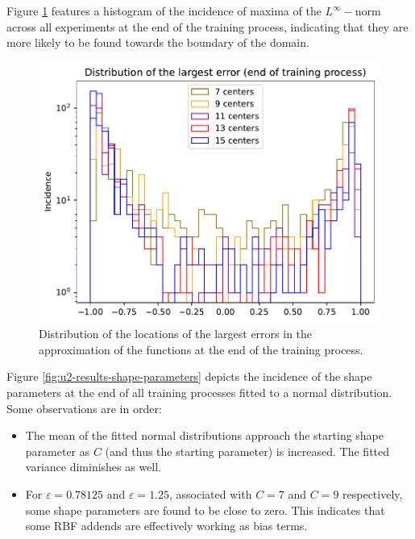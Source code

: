 \documentclass[12pt]{report} %
\begin{document}
Figure \ref{fig:u2-results-largest-error} features a histogram of the incidence of maxima of the $L^\infty-$norm across all experiments at the end of the training process, indicating that they are more likely to be found towards the boundary of the domain.



\begin{figure}[h]
  \includegraphics[width=.7\textwidth]{imagenes/experiments/1d/statistical_1d_full_scheduler_interpolation/distribution_of_errors_L_inf_end.pdf}
  \caption{Distribution of the locations of the largest errors in the approximation of the functions at the end of the training process.}
  \label{fig:u2-results-largest-error}
\end{figure}

Figure \ref{fig:u2-results-shape-parameters} depicts the incidence of the shape parameters at the end of all training processes fitted to a normal distribution. Some observations are in order:
\begin{itemize}
  \item The mean of the fitted normal distributions approach the starting shape parameter as $C$ (and thus the starting parameter) is increased. The fitted variance diminishes as well.
  \item For $\varepsilon=0.78125$ and $\varepsilon=1.25$, associated with $C=7$ and $C=9$ respectively, some shape parameters are found to be close to zero. This indicates that some RBF addends are effectively working as bias terms.
\end{itemize}
\end{document}

